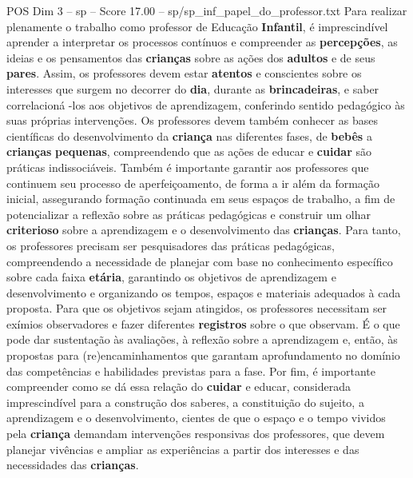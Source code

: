 \begin{textsample}{POS Dim 3 – sp – Score 17.00 – sp/sp\_inf\_papel\_do\_professor.txt}
Para realizar plenamente o trabalho como professor de Educação \textbf{Infantil}, é imprescindível aprender a interpretar os processos contínuos e compreender as \textbf{percepções}, as ideias e os pensamentos das \textbf{crianças} sobre as ações dos \textbf{adultos} e de seus \textbf{pares}.
Assim, os professores devem estar \textbf{atentos} e conscientes sobre os interesses que surgem no decorrer do \textbf{dia}, durante as \textbf{brincadeiras}, e saber correlacioná -los aos objetivos de aprendizagem, conferindo sentido pedagógico às suas próprias intervenções.
Os professores devem também conhecer as bases científicas do desenvolvimento da \textbf{criança} nas diferentes fases, de \textbf{bebês} a \textbf{crianças} \textbf{pequenas}, compreendendo que as ações de educar e \textbf{cuidar} são práticas indissociáveis.
Também é importante garantir aos professores que continuem seu processo de aperfeiçoamento, de forma a ir além da formação inicial, assegurando formação continuada em seus espaços de trabalho, a fim de potencializar a reflexão sobre as práticas pedagógicas e construir um olhar \textbf{criterioso} sobre a aprendizagem e o desenvolvimento das \textbf{crianças}.
Para tanto, os professores precisam ser pesquisadores das práticas pedagógicas, compreendendo a necessidade de planejar com base no conhecimento específico sobre cada faixa \textbf{etária}, garantindo os objetivos de aprendizagem e desenvolvimento e organizando os tempos, espaços e materiais adequados à cada proposta.
Para que os objetivos sejam atingidos, os professores necessitam ser exímios observadores e fazer diferentes \textbf{registros} sobre o que observam.
É o que pode dar sustentação às avaliações, à reflexão sobre a aprendizagem e, então, às propostas para (re)encaminhamentos que garantam aprofundamento no domínio das competências e habilidades previstas para a fase.
Por fim, é importante compreender como se dá essa relação do \textbf{cuidar} e educar, considerada imprescindível para a construção dos saberes, a constituição do sujeito, a aprendizagem e o desenvolvimento, cientes de que o espaço e o tempo vividos pela \textbf{criança} demandam intervenções responsivas dos professores, que devem planejar vivências e ampliar as experiências a partir dos interesses e das necessidades das \textbf{crianças}.

\end{textsample}
